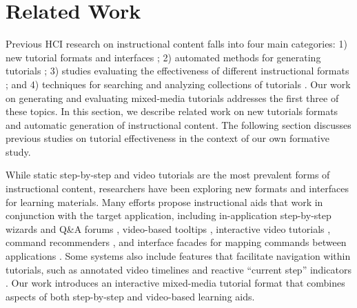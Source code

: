 \section{Related Work}

Previous HCI research on instructional content falls into four main categories:
%
1) new tutorial formats and interfaces \cite{Bergman:2005:DocWizards,Fernquist:2011:SRE:2047196.2047245,Grossman:2010wr,Kelleher:2005:STD:1054972.1055047,Matejka:2009:CCR:1622176.1622214,Matejka:2011:IIQ:2047196.2047218,Pongnumkul:2011ju};
%
2) automated methods for generating tutorials \cite{Denning:2011fy,Grabler:2009jj,Grossman:2010jz,Pongnumkul:2011ju};
%
3) studies evaluating the effectiveness of different instructional formats \cite{Grabler:2009jj,Grossman:2010wr,Harrison:1995uh,Palmiter:1991:ADV:107792.107797,Palmiter:1993:ADL:1461829.1461830};
%
and 4) techniques for searching and analyzing collections of tutorials \cite{Ekstrand:2011:SSL:2047196.2047220,Kong:2012:DTR:2207676.2208549}. Our work on generating and evaluating mixed-media tutorials addresses the first three of these topics. In this section, we describe related work on new tutorials formats and automatic generation of instructional content. The following section discusses previous studies on tutorial effectiveness in the context of our own formative study.

 While static step-by-step and video tutorials are the most prevalent forms of instructional content, researchers have been exploring new formats and interfaces for learning materials. Many efforts propose instructional aids that work in conjunction with the target application, including in-application step-by-step wizards \cite{Bergman:2005:DocWizards,Kelleher:2005:STD:1054972.1055047,Fernquist:2011:SRE:2047196.2047245} and Q\&A forums \cite{Matejka:2011:IIQ:2047196.2047218}, video-based tooltips \cite{Grossman:2010wr}, interactive video tutorials \cite{Pongnumkul:2011ju}, command recommenders \cite{Matejka:2009:CCR:1622176.1622214}, and interface facades for mapping commands between applications \cite{Ramesh:2011:STU:2047196.2047212}. Some systems also include features that facilitate navigation within tutorials, such as annotated video timelines \cite{Grossman:2010jz,Pongnumkul:2011ju} and reactive ``current step'' indicators \cite{Fernquist:2011:SRE:2047196.2047245}. Our work introduces an interactive mixed-media tutorial format that combines aspects of both step-by-step and video-based learning aids.

